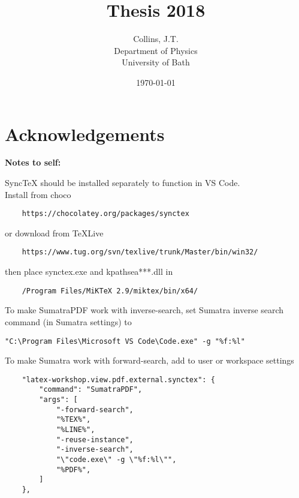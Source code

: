 \documentclass[11pt,a4paper,final]{report}
\title{Thesis 2018}
\author{
	Collins, J.T. \\ 
	Department of Physics\\
	University of Bath\\
}
\date{\today}
\begin{document}
\begin{titlepage}
    
\end{titlepage}

\begin{abstract}
	\setcounter{page}{0}  %
    
\end{abstract}
\clearpage

\clearpage 
\tableofcontents
\clearpage


\chapter*{Acknowledgements}

\color{red}

\noindent\textbf{Notes to self:}

\noindent SyncTeX should be installed separately to function in VS Code. \\
Install from choco
\begin{verbatim}
	https://chocolatey.org/packages/synctex
\end{verbatim}
or download from TeXLive 
\begin{verbatim}
	https://www.tug.org/svn/texlive/trunk/Master/bin/win32/
\end{verbatim}
then place synctex.exe and kpathsea***.dll in 
\begin{verbatim}
	/Program Files/MiKTeX 2.9/miktex/bin/x64/
\end{verbatim}

\noindent To make SumatraPDF work with inverse-search, set Sumatra inverse search command (in Sumatra settings) to 
\begin{verbatim}
"C:\Program Files\Microsoft VS Code\Code.exe" -g "%f:%l"
\end{verbatim}

\noindent To make Sumatra work with forward-search, add to user or workspace settings
\begin{verbatim}
	"latex-workshop.view.pdf.external.synctex": {
		"command": "SumatraPDF",
		"args": [
			"-forward-search",
			"%TEX%",
			"%LINE%",
			"-reuse-instance",
			"-inverse-search",
			"\"code.exe\" -g \"%f:%l\"",
			"%PDF%",
		]
	},
\end{verbatim}

\color{black}

\end{document}
